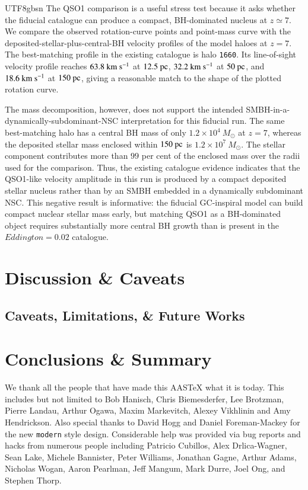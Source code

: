 \documentclass[trackchanges, twocolappendix, twocolumn]{aastex701}
\begin{document}
\begin{CJK*}{UTF8}{gbsn}
The QSO1 comparison is a useful stress test because it asks whether the fiducial catalogue can produce a compact, BH-dominated nucleus at $z\simeq7$. We compare the observed rotation-curve points and point-mass curve with the deposited-stellar-plus-central-BH velocity profiles of the model haloes at $z=7$. The best-matching profile in the existing catalogue is halo \texttt{1660}. Its line-of-sight velocity profile reaches $63.8~{\rm km~s^{-1}}$ at $12.5~{\rm pc}$, $32.2~{\rm km~s^{-1}}$ at $50~{\rm pc}$, and $18.6~{\rm km~s^{-1}}$ at $150~{\rm pc}$, giving a reasonable match to the shape of the plotted rotation curve.

The mass decomposition, however, does not support the intended SMBH-in-a-dynamically-subdominant-NSC interpretation for this fiducial run. The same best-matching halo has a central BH mass of only $1.2\times10^4~M_\odot$ at $z=7$, whereas the deposited stellar mass enclosed within $150~{\rm pc}$ is $1.2\times10^7~M_\odot$. The stellar component contributes more than $99$ per cent of the enclosed mass over the radii used for the comparison. Thus, the existing catalogue evidence indicates that the QSO1-like velocity amplitude in this run is produced by a compact deposited stellar nucleus rather than by an SMBH embedded in a dynamically subdominant NSC\@. This negative result is informative: the fiducial GC-inspiral model can build compact nuclear stellar mass early, but matching QSO1 as a BH-dominated object requires substantially more central BH growth than is present in the $Eddington=0.02$ catalogue.

\section{Discussion \& Caveats} \label{sect:discuss}

\subsection{Caveats, Limitations, \& Future Works} \label{subsect:limit}

\section{Conclusions \& Summary} \label{sect:summary}

\begin{acknowledgments}
We thank all the people that have made this AASTeX what it is today.  This
includes but not limited to Bob Hanisch, Chris Biemesderfer, Lee Brotzman,
Pierre Landau, Arthur Ogawa, Maxim Markevitch, Alexey Vikhlinin and Amy
Hendrickson. Also special thanks to David Hogg and Daniel Foreman-Mackey
for the new {\tt\string modern} style design. Considerable help was provided via bug
reports and hacks from numerous people including Patricio Cubillos, Alex
Drlica-Wagner, Sean Lake, Michele Bannister, Peter Williams, Jonathan
Gagne, Arthur Adams, Nicholas Wogan, Aaron Pearlman, Jeff Mangum, Mark Durre, Joel Ong, and Stephen Thorp.
\end{acknowledgments}


\end{CJK*}
\end{document}
